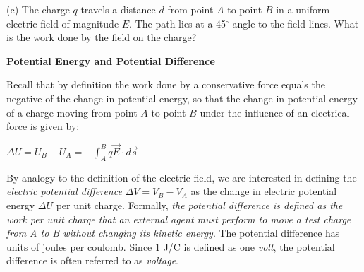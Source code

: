 \pagebreak[2]
(c) The charge $q$ travels a distance $d$ from point $A$ to point $B$ in a
uniform electric field of magnitude $E$. The path lies at a 45\( ^{\circ } \)
angle to the field lines. What is the work done by the field on the
charge?

\vspace{0.3cm}
{\centering {} \par}
\answerspace{0.5cm}

\textbf{Potential Energy and Potential Difference}

Recall that by definition the work done by a conservative force equals
the negative of the change in potential energy, so that the change
in potential energy of a charge moving from point $A$ to point $B$ under
the influence of an electrical force is given by:

{\centering \( \Delta U=U_{B}-U_{A}=-\int ^{B}_{A}q\overrightarrow{E}\cdot d\overrightarrow{s} \)\par}

By analogy to the definition of the electric field, we are interested
in defining the \emph{electric potential difference} \( \Delta V=V_{B}-V_{A} \)
as the change in electric potential energy \( \Delta U \) per
unit charge. Formally, \emph{the potential difference is defined as
the work per unit charge that an external agent must perform to move
a test charge from A to B without changing its kinetic energy}. The
potential difference has units of joules per coulomb. Since 1 J/C
is defined as one \emph{volt}, the potential difference is often referred
to as \emph{voltage}.

